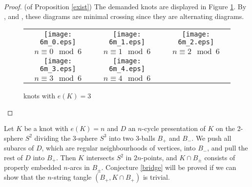 \documentclass{amsart}
\theoremstyle{definition}
\theoremstyle{remark}
\numberwithin{equation}{section}
\begin{document}
\begin{proof}(of Proposition \ref{exist})
The demanded knots are displayed in Figure \ref{6m}.
By \cite{Kau}, \cite{Mur} and \cite{Thi}, these diagrams are minimal crossing since they are alternating diagrams.
\begin{figure}[htbp]
	\begin{center}
	\begin{tabular}{ccc}
	\texttt{[image: 6m\_0.eps]}&
	\texttt{[image: 6m\_1.eps]}&
	\texttt{[image: 6m\_2.eps]}\\
	$n\equiv 0\mod 6$ & $n\equiv 1\mod 6$ & $n\equiv 2\mod 6$ \\
	\texttt{[image: 6m\_3.eps]}&
	\texttt{[image: 6m\_4.eps]}&
	\\
	$n\equiv 3\mod 6$ & $n\equiv 4\mod 6$ & \\
	\end{tabular}
	\end{center}
	\caption{knots with $e(K)=3$}
	\label{6m}
\end{figure}
\end{proof}

Let $K$ be a knot with $e(K)=n$ and $D$ an $n$-cycle presentation of $K$ on the 2-sphere $S^2$ dividing the 3-sphere $S^3$ into two 3-balls $B_+$ and $B_-$.
We push all subarcs of $D$, which are regular neighbourhoods of vertices, into $B_-$, and pull the rest of $D$ into $B_+$.
Then $K$ intersects $S^2$ in $2n$-points, and $K\cap B_{\pm}$ consists of properly embedded $n$-arcs in $B_{\pm}$.
Conjecture \ref{bridge} will be proved if we can show that the $n$-string tangle $(B_+,K\cap B_+)$ is trivial.
\end{document}
